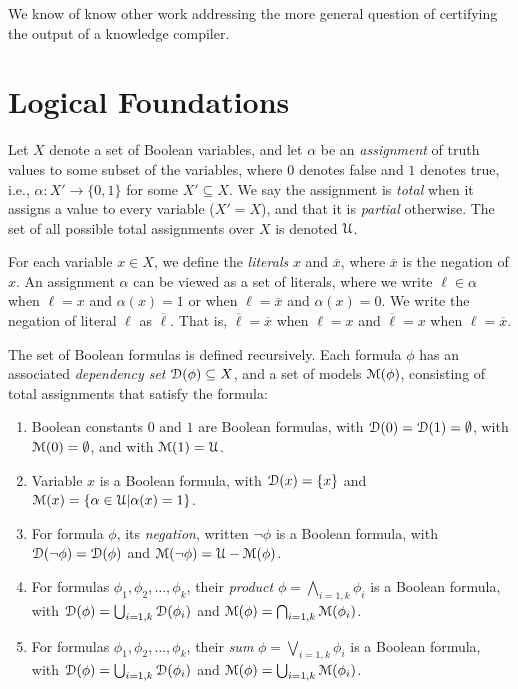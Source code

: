 \documentclass[letterpaper,USenglish,cleveref, autoref, thm-restate]{lipics-v2021}
\newcommand{\boolnot}{\neg}
\newcommand{\obar}[1]{\overline{#1}}
\newcommand{\lit}{\ell}
\newcommand{\varset}{X}
\newcommand{\dependencyset}{{\cal D}}
\newcommand{\assign}{\alpha}
\newcommand{\uassign}{{\cal U}}
\newcommand{\modelset}{{\cal M}}
\begin{document}
We know of know other work addressing the more general question of
certifying the output of a knowledge compiler.


\section{Logical Foundations}

  Let $\varset$ denote a set of Boolean variables, and let $\assign$
  be an {\em assignment} of truth values to some subset of the
  variables, where $0$ denotes false and $1$ denotes true, i.e.,
  $\assign \colon \varset' \rightarrow \{0,1\}$ for some $\varset'
  \subseteq \varset$.  We say the assignment is {\em total} when it
  assigns a value to every variable ($\varset' = \varset$), and that
  it is {\em partial} otherwise.
  The set of all possible total assignments over
  $\varset$ is denoted $\uassign$.

For each variable $x \in \varset$,
  we define the {\em literals} $x$ and $\obar{x}$, where $\obar{x}$ is the
  negation of $x$. An
  assignment $\assign$ can be viewed as a set of literals, where
  we write $\lit \in \assign$ when $\lit = x$ and $\assign(x) = 1$ or when
  $\lit = \obar{x}$ and $\assign(x) = 0$.  We write the negation of literal $\lit$ as $\obar{\lit}$.  That is, $\obar{\lit} = \obar{x}$ when $\lit = x$ and
$\obar{\lit} = x$ when $\lit = \obar{x}$.


\begin{definition}
  The set of Boolean formulas is defined recursively.  Each
  formula $\phi$ has an associated {\em dependency set}
  $\dependencyset(\phi)  \subseteq \varset$, and a set of models $\modelset(\phi)$,
  consisting of total assignments that satisfy the formula:
  \begin{enumerate}
  \item Boolean constants $0$ and $1$ are Boolean formulas,
    with $\dependencyset(0) = \dependencyset(1) = \emptyset$, with $\modelset(0) = \emptyset$, and with $\modelset(1) = \uassign$.
  \item Variable $x$ is a Boolean formula, with $\dependencyset(x) = \{x\}$
    and $\modelset(x) = \{\assign \in \uassign | \assign(x)=1\}$.
  \item For formula $\phi$, its {\em negation}, written $\boolnot \phi$ is a Boolean formula,
    with $\dependencyset(\boolnot \phi) = \dependencyset(\phi)$ and $\modelset(\boolnot \phi) = \uassign - \modelset(\phi)$.
  \item For formulas $\phi_1, \phi_2, \ldots, \phi_k$, their {\em product} $\phi = \bigwedge_{i=1,k} \phi_i$ is a Boolean formula, with
      $\dependencyset(\phi) = \bigcup_{i=1,k} \dependencyset(\phi_i)$ and
      $\modelset(\phi) = \bigcap_{i=1,k} \modelset(\phi_i)$.
  \item For formulas $\phi_1, \phi_2, \ldots, \phi_k$, their {\em sum} $\phi = \bigvee_{i=1,k} \phi_i$ is a Boolean formula, with
      $\dependencyset(\phi) = \bigcup_{i=1,k} \dependencyset(\phi_i)$ and
      $\modelset(\phi) = \bigcup_{i=1,k} \modelset(\phi_i)$.
  \end{enumerate}
\label{def:boolean}
\end{definition}
\end{document}
